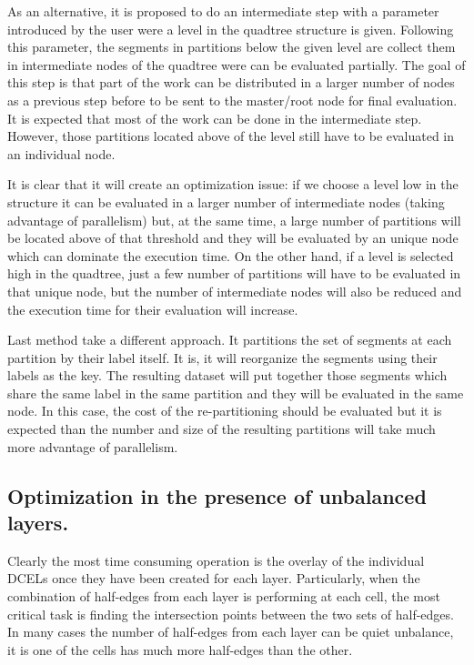As an alternative, it is proposed to do an intermediate step with a parameter introduced by the user were a level in the quadtree structure is given.  Following this parameter, the segments in partitions below the given level are collect them in intermediate nodes of the quadtree were can be evaluated partially.  The goal of this step is that part of the work can be distributed in a larger number of nodes as a previous step before to be sent to the master/root node for final evaluation.  It is expected that most of the work can be done in the intermediate step.  However, those partitions located above of the level still have to be evaluated in an individual node.

It is clear that it will create an optimization issue: if we choose a level low in the structure it can be evaluated in a larger number of intermediate nodes (taking advantage of parallelism) but, at the same time, a large number of partitions will be located above of that threshold and they will be evaluated by an unique node which can dominate the execution time.  On the other hand, if a level is selected high in the quadtree, just a few number of partitions will have to be evaluated in that unique node, but the number of intermediate nodes will also be reduced and the execution time for their evaluation will increase.

Last method take a different approach.  It partitions the set of segments at each partition by their label itself.  It is, it will reorganize the segments using their labels as the key.  The resulting dataset will put together those segments which share the same label in the same partition and they will be evaluated in the same node.  In this case, the cost of the re-partitioning should be evaluated but it is expected than the number and size of the resulting partitions will take much more advantage of parallelism.

\subsection{Optimization in the presence of unbalanced layers.}\label{sec:unbalance}
Clearly the most time consuming operation is the overlay of the individual DCELs once they have been created for each layer.  Particularly, when the combination of half-edges from each layer is performing at each cell, the most critical task is finding the intersection points between the two sets of half-edges. In many cases the number of half-edges from each layer can be quiet unbalance, it is one of the cells has much more half-edges than the other.


